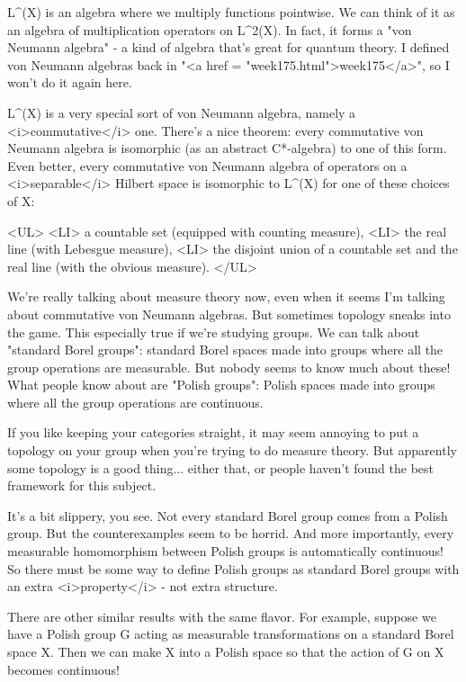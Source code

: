 L^{\infty }(X) is an algebra where we multiply functions
pointwise.  We can think of it as an algebra of multiplication
operators on L^{2}(X).  In fact, it forms a "von Neumann
algebra" - a kind of algebra that's great for quantum theory.  I
defined von Neumann algebras back in "<a href =
"week175.html">week175</a>", so I won't do it again here.

L^{\infty }(X) is a very special sort of von Neumann algebra,
namely a <i>commutative</i> one.  There's a nice theorem: every
commutative von Neumann algebra is isomorphic (as an abstract C*-algebra)
to one of this form.
Even better, every commutative von Neumann algebra of operators on a
<i>separable</i> Hilbert space is isomorphic 
to L^{\infty }(X) for one of these choices of X:

<UL>
<LI>
a countable set (equipped with counting measure),
<LI>
the real line (with Lebesgue measure),
<LI>
the disjoint union of a countable set and the real line 
(with the obvious measure).
</UL>

We're really talking about measure theory now, even when it seems
I'm talking about commutative von Neumann algebras.  But sometimes
topology sneaks into the game.  This especially true if we're studying 
groups.  We can talk about "standard Borel groups": standard Borel
spaces made into groups where all the group operations are measurable.
But nobody seems to know much about these!  What people know about are
"Polish groups": Polish spaces made into groups where all the group
operations are continuous.  

If you like keeping your categories straight, it may seem annoying to
put a topology on your group when you're trying to do measure theory.
But apparently some topology is a good thing... either that, or people
haven't found the best framework for this subject.

It's a bit slippery, you see.  Not every standard Borel group comes 
from a Polish group.  But the counterexamples seem to be horrid.
And more importantly, every measurable homomorphism between Polish
groups is automatically continuous!  So there must be some way to 
define Polish groups as standard Borel groups with an extra <i>property</i> -
not extra structure.

There are other similar results with the same flavor.  For example,
suppose we have a Polish group G acting as measurable transformations 
on a standard Borel space X.  Then we can make X into a Polish space so
that the action of G on X becomes continuous!  

